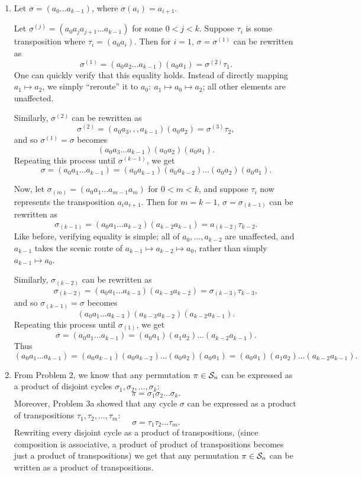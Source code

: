 \documentclass{homework}
\begin{document}
\begin{solution}
  \begin{enumerate}[label=(\alph*)]
    \item Let $\sigma=(a_0\ldots a_{k-1})$, where $\sigma(a_i)=a_{i+1}$.

      Let $\sigma^{(j)}=(a_0a_ja_{j+1}\ldots a_{k-1})$  for some $0<j<k$. Suppose $\tau_i$ is some
      transposition where $ \tau_i=(a_0a_i)$. Then for $i=1$, $\sigma=\sigma^{(1)}$ can be rewritten
      as \[
        \sigma^{(1)}=(a_0a_2\ldots a_{k-1})(a_0a_1)=\sigma^{(2)}\tau_1
      .\] One can quickly verify that this equality holds. Instead of directly mapping $a_1\mapsto
      a_2$, we simply ``reroute'' it to $ a_0:\ a_1\mapsto a_0\mapsto a_2$; all other elements are
      unaffected.

      Similarly, $  \sigma^{(2)}$ can be rewritten as \[
        \sigma^{(2)}=(a_0a_3,,, a_{k-1})(a_0a_2)=\sigma^{(3)}\tau_2
      ,\] and so $\sigma^{(1)}=\sigma$ becomes \[
        (a_0a_3... a_{k-1})(a_0a_2)(a_0a_1)
      .\] Repeating this process until $\sigma^{(k-1)}$, we get \[
        \sigma=(a_0a_1\ldots a_{k-1})=(a_0a_{k-1})(a_0a_{k-2})\ldots(a_0a_2)(a_0a_1)
      .\]

      Now, let $\sigma_{(m)}=(a_0a_1\ldots a_{m-1}a_{m})$ for $0<m<k$, and suppose $\tau_i$ now
      represents the transposition $a_ia_{i+1}$. Then for $m=k-1$, $\sigma=\sigma_{(k-1)}$ can be
      rewritten as \[
        \sigma_{(k-1)}=(a_0a_1\ldots a_{k-2})(a_{k-2}a_{k-1})=a_{(k-2)}\tau_{k-2}
      .\] Like before, verifying equality is simple; all of $a_0,\ldots,a_{k-2}$ are unaffected, and
      $a_{k-1}$ takes the scenic route of $a_{k-1}\mapsto a_{k-2}\mapsto a_0$, rather than simply
      $a_{k-1}\mapsto a_0$.

      Similarly, $\sigma_{(k-2)}$  can be rewritten as \[
        \sigma_{(k-2)}=(a_0a_1\ldots a_{k-3})(a_{k-3}a_{k-2})=\sigma_{(k-3)}\tau_{k-3}
      ,\] and so $\sigma_{(k-1)}=\sigma $ becomes \[
      (a_0a_1\ldots a_{k-3})(a_{k-3}a_{k-2})(a_{k-2}a_{k-1})
    .\] Repeating this process until $\sigma_{(1)}$, we get \[
        \sigma = (a_0a_1\ldots a_{k-1})=(a_0a_1)(a_1a_2)\ldots(a_{k-2}a_{k-1})
      .\] Thus \[
        (a_0a_1\ldots
          a_{k-1})=(a_0a_{k-1})(a_0a_{k-2})\ldots(a_0a_2)(a_0a_1)=(a_0a_1)(a_1a_2)\ldots(a_{k-2}a_{k-1})
      .\] 

    \item From Problem $2$, we know that any permutation $\pi\in \mathcal{S}_n$ can be expressed as a
      product of disjoint cycles $\sigma_1,\sigma_2,\ldots,\sigma_k$: \[
        \pi = \sigma_1\sigma_2\ldots\sigma_k
      .\] Moreover, Problem 3a showed that any cycle $\sigma$ can be expressed as a product of
      transpositions $\tau_1,\tau_2,\ldots,\tau_m$: \[
        \sigma=\tau_1\tau_2\ldots\tau_m
      .\] Rewriting every disjoint cycle as a product of transpositions, (since composition is
      associative, a product of product of transpositions becomes just a product of transpositions)
      we get that any permutation $\pi\in \mathcal{S}_n$ can be written as a product of transpositions.


\end{enumerate}
\end{solution}
\end{document}
